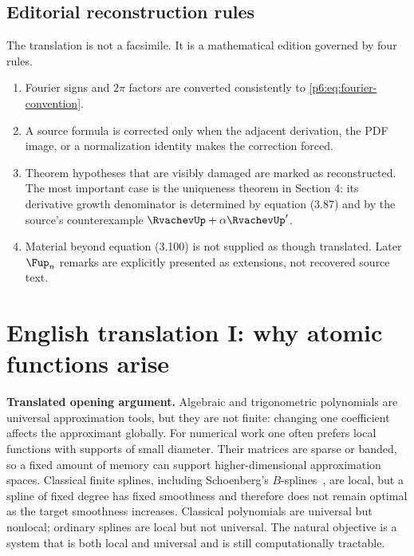 \documentclass[11pt,oneside]{article}
\numberwithin{equation}{section}
\theoremstyle{definition}
\theoremstyle{remark}
\begin{document}
\subsection{Editorial reconstruction rules}

The translation is not a facsimile.  It is a mathematical edition governed by
four rules.
\begin{enumerate}
\item Fourier signs and $2\pi$ factors are converted consistently to
\eqref{p6:eq:fourier-convention}.
\item A source formula is corrected only when the adjacent derivation, the PDF
image, or a normalization identity makes the correction forced.
\item Theorem hypotheses that are visibly damaged are marked as reconstructed.
The most important case is the uniqueness theorem in Section 4: its derivative
growth denominator is determined by equation (3.87) and by the source's
counterexample $\RvachevUp+\alpha\RvachevUp'$.
\item Material beyond equation (3.100) is not supplied as though translated.
Later $\Fup_n$ remarks are explicitly presented as extensions, not recovered
source text.
\end{enumerate}

\section{English translation I: why atomic functions arise}

\begin{sourcebox}
\textbf{Translated opening argument.}
Algebraic and trigonometric polynomials are universal approximation tools, but
they are not finite: changing one coefficient affects the approximant globally.
For numerical work one often prefers local functions with supports of small
diameter.  Their matrices are sparse or banded, so a fixed amount of memory can
support higher-dimensional approximation spaces.  Classical finite splines,
including Schoenberg's $B$-splines~\cite{p6:schoenberg}, are local, but a spline of fixed degree has
fixed smoothness and therefore does not remain optimal as the target smoothness
increases.  Classical polynomials are universal but nonlocal; ordinary splines
are local but not universal.  The natural objective is a system that is both
local and universal and is still computationally tractable.
\end{sourcebox}
\end{document}
